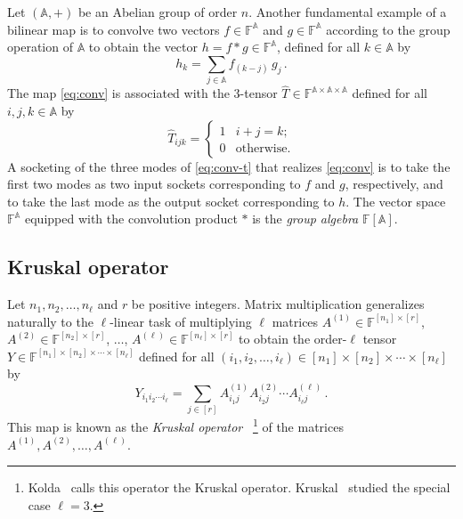 \documentclass{toc}
\newcommand{\F}{\ensuremath{\mathbb{F}}}
\begin{document}
Let $(\mathbb{A},+)$ be an Abelian group of order $n$.
Another fundamental example of a bilinear map is to convolve
two vectors $f\in\F^{\mathbb{A}}$ and $g\in\F^{\mathbb{A}}$ according to the
group operation of $\mathbb{A}$ to obtain
the vector $h=f*g\in\F^{\mathbb{A}}$, defined for all $k\in \mathbb{A}$ by
\begin{equation}
\label{eq:conv}
h_k=\sum_{j\in \mathbb{A}}f_{(k-j)}\,g_j\,.
\end{equation}
The map \eqref{eq:conv} is associated with the $3$-tensor
$\hat{T}\in\F^{\mathbb{A}\times\mathbb{A}\times\mathbb{A}}$ defined for all
$i,j,k\in \mathbb{A}$ by
\begin{equation}
\label{eq:conv-t}
\hat{T}_{ijk}=
\begin{cases}
1 & \text{$i+j=k$};\\
0 & \text{otherwise}.
\end{cases}
\end{equation}
A socketing of the three modes of \eqref{eq:conv-t} that
realizes \eqref{eq:conv}
is to take the first two modes as two input sockets corresponding
to $f$ and $g$, respectively, and to take the last mode as the
output socket corresponding to $h$. The vector space
%
%
$\F^{\mathbb{A}}$  %
equipped with the convolution product $*$ is the
\emph{group algebra} $\F[\mathbb{A}]$.


\subsection{Kruskal operator}
\label{sect:kruskal}

Let $n_1,n_2,\ldots,n_\ell$ and $r$ be positive integers.
Matrix multiplication generalizes naturally to the $\ell$-linear task
of multiplying $\ell$ matrices
$A^{(1)}\in\F^{[n_1]\times [r]}$,
$A^{(2)}\in\F^{[n_2]\times [r]}$,
$\ldots$,
$A^{(\ell)}\in\F^{[n_\ell]\times [r]}$
to obtain the order-$\ell$ tensor
$Y\in\F^{[n_1]\times [n_2]\times \cdots\times [n_\ell]}$
defined for all
$(i_1,i_2,\ldots,i_\ell)\in[n_1]\times[n_2]\times\cdots\times[n_\ell]$ by
\begin{equation}
\label{eq:kruskal}
Y_{i_1i_2\cdots i_\ell}
=\sum_{j\in [r]} A^{(1)}_{i_1j}A^{(2)}_{i_2j}\cdots A^{(\ell)}_{i_\ell j}\,.
\end{equation}
%
%
%
This map 
%
is known as the \emph{Kruskal operator}~\cite{Kruskal1977,Kolda2006}%
\footnote{Kolda~\cite{Kolda2006} calls this operator the Kruskal operator.
Kruskal~\cite{Kruskal1977} studied %
%
%
%
the special case $\ell = 3$.}{}
%
of the matrices $A^{(1)},A^{(2)},\ldots,A^{(\ell)}$.
\end{document}
